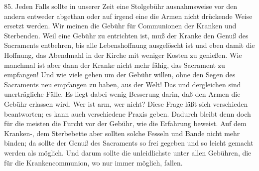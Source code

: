 85. Jeden Falls sollte in unserer Zeit eine Stolgebühr ausnahmsweise vor den andern entweder abgethan oder auf irgend eine die Armen nicht drückende Weise ersetzt werden. Wir meinen die Gebühr für Communionen der Kranken und Sterbenden. Weil eine Gebühr zu entrichten ist, muß der Kranke den Genuß des Sacraments entbehren, bis alle Lebenshoffnung ausgelöscht ist und eben damit die Hoffnung, das Abendmahl in der Kirche mit weniger Kosten zu genießen. Wie manchmal ist aber dann der Kranke nicht mehr fähig, das Sacrament zu empfangen! Und wie viele gehen um der Gebühr willen, ohne den Segen des Sacraments neu empfangen zu haben, aus der Welt! Das und dergleichen sind unerträgliche Fälle. Es liegt dabei wenig Besserung darin, daß den Armen die Gebühr erlassen wird. Wer ist arm, wer nicht? Diese Frage läßt sich verschieden beantworten; es kann auch verschiedene Praxis geben. Dadurch bleibt denn doch für die meisten die Furcht vor der Gebühr, wie die Erfahrung beweist. Auf dem Kranken-, dem Sterbebette aber sollten solche Fesseln und Bande nicht mehr binden; da sollte der Genuß des Sacraments so frei gegeben und so leicht gemacht
werden als möglich. Und darum sollte die unleidlichste unter allen Gebühren, die für die Krankencommunion, wo nur immer möglich, fallen.

